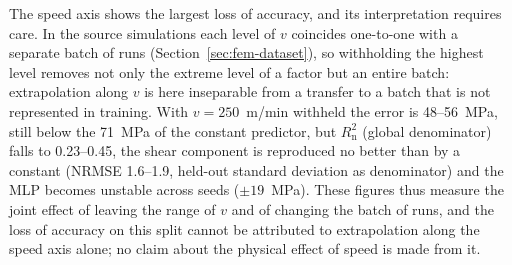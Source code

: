 The speed axis shows the largest loss of accuracy, and its interpretation requires care. In the source simulations each level of $v$ coincides one-to-one with a separate batch of runs (Section~\ref{sec:fem-dataset}), so withholding the highest level removes not only the extreme level of a factor but an entire batch: extrapolation along $v$ is here inseparable from a transfer to a batch that is not represented in training. With $v=250$~m/min withheld the error is 48--56~MPa, still below the 71~MPa of the constant predictor, but $R^2_{\mathrm{n}}$ (global denominator) falls to 0.23--0.45, the shear component is reproduced no better than by a constant (NRMSE 1.6--1.9, held-out standard deviation as denominator) and %
the MLP becomes unstable across seeds ($\pm19$~MPa). These figures thus measure the joint effect of leaving the range of $v$ and of changing the batch of runs, and the loss of accuracy on this split cannot be attributed to extrapolation along the speed axis alone; no claim about the physical effect of speed is made from it. %



